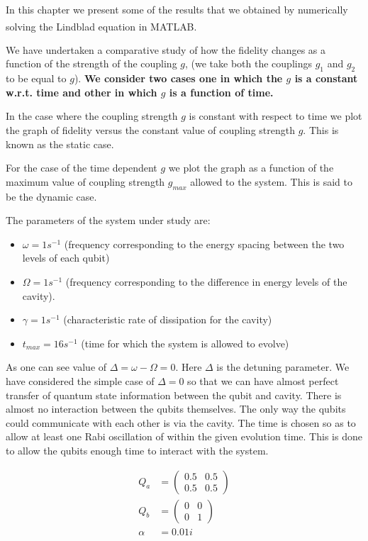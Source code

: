 In this chapter we present some of the results that we obtained by numerically solving the Lindblad equation  in MATLAB\textsuperscript{\textregistered}.

We have undertaken a comparative study of how the fidelity changes as a function of the strength of the coupling $g$, (we take both the couplings $g_{1}$ and $g_{2}$ to be equal to $g$). \textbf{We consider two cases one in which the  $g$ is a constant w.r.t. time and other in which  $g$ is a function of time.}

In the case where the coupling strength $g$ is constant with respect to time we plot the graph of fidelity versus the constant value of coupling strength $g$. This is known as the static case. 

For the case of the time dependent $g$ we plot the graph as a function of the maximum value of coupling strength $g_{max}$ allowed to the system. This is said to be the dynamic case.

The parameters of the system under study are:
\begin{itemize}
\item $\omega = 1 s^{-1} $ (frequency corresponding to the energy spacing between the two levels of each qubit)
\item $\Omega = 1 s^{-1} $ (frequency corresponding to the difference in energy levels of the cavity).
\item $\gamma = 1 s^{-1} $ (characteristic rate of dissipation for the cavity) 
\item $t_{max} = 16 s^{-1}$ (time for which the system is allowed to evolve)
\end{itemize}

As one can see value of $\Delta = \omega - \Omega = 0 $. Here $\Delta$ is the detuning parameter. We have considered the simple case of $\Delta = {0}$ so that we can have almost perfect transfer of quantum state information between the qubit and cavity. There is almost no interaction between the qubits themselves. The only way the qubits could communicate with each other is via the cavity. The time is chosen so as to allow at least one Rabi oscillation of within the given evolution time. This is done to allow the qubits enough time to interact with the system. 

\begin{align}
Q_{a}&=\begin{pmatrix} 0.5 & 0.5 \\ 0.5 & 0.5 \end{pmatrix}\\
Q_{b} &= \begin{pmatrix} 0 & 0 \\ 0 & 1 \end{pmatrix}\\
\alpha &= 0.01{i}
\end{align}

